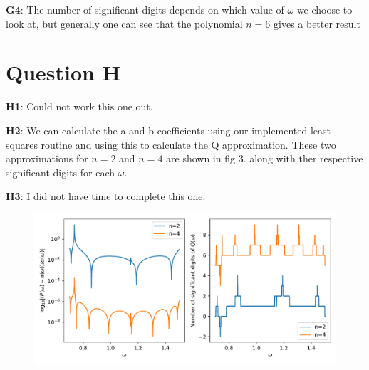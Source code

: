 \documentclass[a4paper,12pkt]{report}
\begin{document}
\noindent
\textbf{G4}: The number of significant digits depends on which value of $\omega$ we choose to look at, but generally one can see that the polynomial $n = 6$ gives a better result

\section*{Question H}

\noindent
\textbf{H1}: Could not work this one out.



\noindent
\textbf{H2}: We can calculate the a and b coefficients using our implemented least squares routine and using this to calculate the Q approximation. 
These two approximations for $n=2$ and $n=4$ are shown in fig 3. along with ther respective significant digits for each $\omega$.



\noindent
\textbf{H3}: I did not have time to complete this one.


\begin{figure}[h]
    \includegraphics[width = 12cm]{h.pdf}
    \centering
\end{figure}
\end{document}

